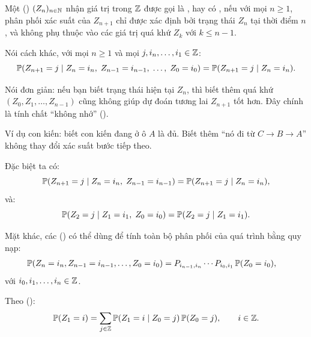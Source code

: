 \begin{dinhnghia}
Một  () $(Z_n)_{n\in\mathbb{N}}$ nhận giá trị trong $\mathbb{Z}$
được gọi là , hay có , nếu với mọi $n \geq 1$,
phân phối xác suất của $Z_{n+1}$ chỉ được xác định bởi trạng thái $Z_n$ tại thời điểm $n$,
và không phụ thuộc vào các giá trị quá khứ $Z_k$ với $k \leq n-1$.

Nói cách khác, với mọi $n \geq 1$ và mọi $j, i_n, \ldots, i_1 \in \mathbb{Z}$:
\[
  \mathbb{P}(Z_{n+1} = j \mid Z_n = i_n,\; Z_{n-1} = i_{n-1},\; \ldots,\; Z_0 = i_0)
  = \mathbb{P}(Z_{n+1} = j \mid Z_n = i_n).
\]
\end{dinhnghia}

\begin{tomtat}
Nói đơn giản: nếu bạn biết trạng thái hiện tại $Z_n$,
thì biết thêm quá khứ $(Z_0, Z_1, \ldots, Z_{n-1})$ cũng không giúp dự đoán tương lai $Z_{n+1}$ tốt hơn.
Đây chính là tính chất ``không nhớ'' ().

Ví dụ con kiến: biết con kiến đang ở ô $A$ là đủ. Biết thêm ``nó đi từ $C \to B \to A$'' không thay đổi xác suất bước tiếp theo.
\end{tomtat}

Đặc biệt ta có:
\[
  \mathbb{P}(Z_{n+1} = j \mid Z_n = i_n,\; Z_{n-1} = i_{n-1}) = \mathbb{P}(Z_{n+1} = j \mid Z_n = i_n),
\]
và:
\[
  \mathbb{P}(Z_2 = j \mid Z_1 = i_1,\; Z_0 = i_0) = \mathbb{P}(Z_2 = j \mid Z_1 = i_1).
\]

Mặt khác, các  ()
có thể dùng để tính toàn bộ phân phối của quá trình bằng quy nạp:
\begin{align}
  \mathbb{P}(Z_n = i_n, Z_{n-1} = i_{n-1}, \ldots, Z_0 = i_0)
  &= P_{i_{n-1}, i_n} \cdots P_{i_0, i_1} \, \mathbb{P}(Z_0 = i_0),
\end{align}
với $i_0, i_1, \ldots, i_n \in \mathbb{Z}$.

Theo  ():
\begin{equation}\label{eq:total-prob}
  \mathbb{P}(Z_1 = i) = \sum_{j \in \mathbb{Z}} \mathbb{P}(Z_1 = i \mid Z_0 = j)\,\mathbb{P}(Z_0 = j), \qquad i \in \mathbb{Z}.
\end{equation}

